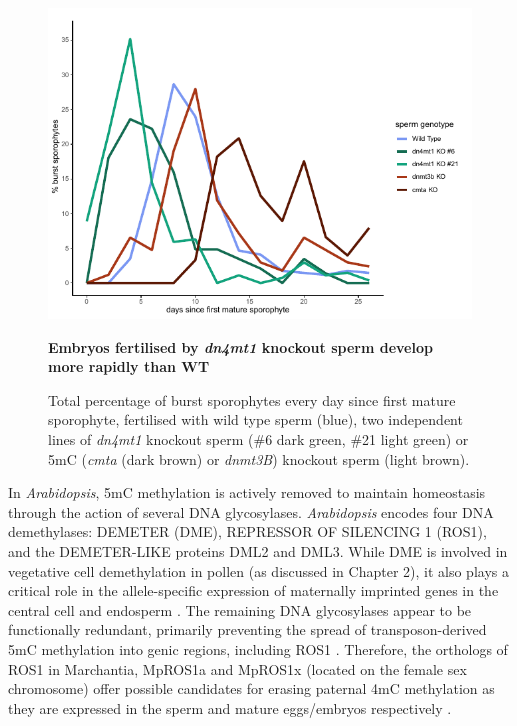\begin{figure}[htbp!] 
\centering    
    \includegraphics[width=1\textwidth]{Chapter3/Figs/Intro/burstpeak_nuclei_number.pdf}
\caption{\textbf{Embryos fertilised by \textit{dn4mt1} knockout sperm develop more rapidly than WT}}
\label{fig:burstpeak}
\captionsetup{font=small}
    \caption*{Total percentage of burst sporophytes every day since first mature sporophyte, fertilised with wild type sperm (blue), two independent lines of \textit{dn4mt1} knockout sperm (\#6 dark green, \#21 light green) or 5mC (\textit{cmta} (dark brown) or \textit{dnmt3B}) knockout sperm (light brown). }
\end{figure}

In \textit{Arabidopsis}, 5mC methylation is actively removed to maintain homeostasis through the action of several DNA glycosylases. \textit{Arabidopsis} encodes four DNA demethylases: DEMETER (DME), REPRESSOR OF SILENCING 1 (ROS1), and the DEMETER-LIKE proteins DML2 and DML3. While DME is involved in vegetative cell demethylation in pollen \cite{RN57} (as discussed in Chapter 2), it also plays a critical role in the allele-specific expression of maternally imprinted genes in the central cell and endosperm \cite{RN235}. The remaining DNA glycosylases appear to be functionally redundant, primarily preventing the spread of transposon-derived 5mC methylation into genic regions\cite{RN288}, including ROS1 \cite{RN168}. Therefore, the orthologs of ROS1 in Marchantia, MpROS1a and MpROS1x (located on the female sex chromosome) offer possible candidates for erasing paternal 4mC methylation as they are expressed in the sperm \cite{RN212} and mature eggs/embryos \cite{RN257} respectively \cite{RN169,RN257,RN189}.


